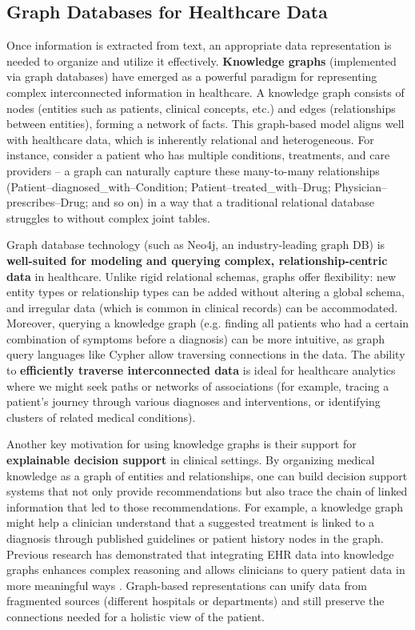 \subsection{Graph Databases for Healthcare Data}

Once information is extracted from text, an appropriate data representation is needed to organize and utilize it effectively. \textbf{Knowledge graphs} (implemented via graph databases) have emerged as a powerful paradigm for representing complex interconnected information in healthcare. A knowledge graph consists of nodes (entities such as patients, clinical concepts, etc.) and edges (relationships between entities), forming a network of facts. This graph-based model aligns well with healthcare data, which is inherently relational and heterogeneous. For instance, consider a patient who has multiple conditions, treatments, and care providers – a graph can naturally capture these many-to-many relationships (Patient–diagnosed\_with–Condition; Patient–treated\_with–Drug; Physician–prescribes–Drug; and so on) in a way that a traditional relational database struggles to without complex joint tables.

Graph database technology (such as Neo4j, an industry-leading graph DB) is \textbf{well-suited for modeling and querying complex, relationship-centric data} in healthcare. Unlike rigid relational schemas, graphs offer flexibility: new entity types or relationship types can be added without altering a global schema, and irregular data (which is common in clinical records) can be accommodated. Moreover, querying a knowledge graph (e.g. finding all patients who had a certain combination of symptoms before a diagnosis) can be more intuitive, as graph query languages like Cypher allow traversing connections in the data. The ability to \textbf{efficiently traverse interconnected data} is ideal for healthcare analytics where we might seek paths or networks of associations (for example, tracing a patient's journey through various diagnoses and interventions, or identifying clusters of related medical conditions).

Another key motivation for using knowledge graphs is their support for \textbf{explainable decision support} in clinical settings. By organizing medical knowledge as a graph of entities and relationships, one can build decision support systems that not only provide recommendations but also trace the chain of linked information that led to those recommendations. For example, a knowledge graph might help a clinician understand that a suggested treatment is linked to a diagnosis through published guidelines or patient history nodes in the graph. Previous research has demonstrated that integrating EHR data into knowledge graphs enhances complex reasoning and allows clinicians to query patient data in more meaningful ways \parencite{Rotmensch2017}. Graph-based representations can unify data from fragmented sources (different hospitals or departments) and still preserve the connections needed for a holistic view of the patient.

